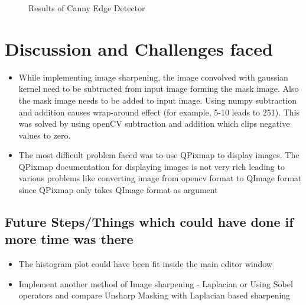 \documentclass[letterpaper, 10 pt, conference]{ieeeconf}  %
\begin{document}
\begin{figure}[h!]%
	\centering
    \qquad
    \caption{Results of Canny Edge Detector}%
    \label{fig:canny_edge_detector2}%
\end{figure}

\section{\textbf{Discussion and Challenges faced}}
\begin{itemize}
\item While implementing image sharpening, the image convolved with gaussian kernel need to be subtracted from input image forming the mask image. Also the mask image needs to be added to input image. Using numpy subtraction and addition causes wrap-around effect (for example, 5-10 leads to 251). This was solved by using openCV subtraction and addition which clips negative values to zero.
\item The most difficult problem faced was to use QPixmap to display images. The QPixmap documentation for displaying images is not very rich leading to various problems like converting image from opencv format to QImage format since QPixmap only takes QImage format as argument

\end{itemize}
\subsection{\textbf{Future Steps/Things which could have done if more time was there}}
\begin{itemize}
\item The histogram plot could have been fit inside the main editor window
\item Implement another method of Image sharpening - Laplacian or Using Sobel operators and compare Unsharp Masking with Laplacian based sharpening
\end{itemize}
\end{document}
